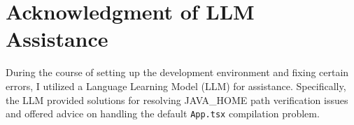 \documentclass{article}
\begin{document}
\section{Acknowledgment of LLM Assistance}
During the course of setting up the development environment and fixing certain errors, I utilized a Language Learning Model (LLM) for assistance. Specifically, the LLM provided solutions for resolving JAVA\_HOME path verification issues and offered advice on handling the default \texttt{App.tsx} compilation problem.
\end{document}
